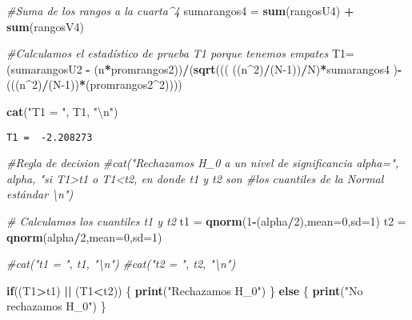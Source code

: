 \documentclass[
  a4paper,
  oneside,
  openany]{book}
\newenvironment{Shaded}{\begin{snugshade}}{\end{snugshade}}
\newcommand{\CharTok}[1]{\textcolor[rgb]{0.31,0.60,0.02}{#1}}
\newcommand{\CommentTok}[1]{\textcolor[rgb]{0.56,0.35,0.01}{\textit{#1}}}
\newcommand{\ControlFlowTok}[1]{\textcolor[rgb]{0.13,0.29,0.53}{\textbf{#1}}}
\newcommand{\DataTypeTok}[1]{\textcolor[rgb]{0.13,0.29,0.53}{#1}}
\newcommand{\DecValTok}[1]{\textcolor[rgb]{0.00,0.00,0.81}{#1}}
\newcommand{\KeywordTok}[1]{\textcolor[rgb]{0.13,0.29,0.53}{\textbf{#1}}}
\newcommand{\NormalTok}[1]{#1}
\newcommand{\OperatorTok}[1]{\textcolor[rgb]{0.81,0.36,0.00}{\textbf{#1}}}
\newcommand{\StringTok}[1]{\textcolor[rgb]{0.31,0.60,0.02}{#1}}
\begin{document}
\begin{Shaded}
\begin{Highlighting}[]
\CommentTok{\#Suma de los rangos a la cuarta\^{}4}
\NormalTok{sumarangos4 =}\StringTok{ }\KeywordTok{sum}\NormalTok{(rangosU4) }\OperatorTok{+}\StringTok{ }\KeywordTok{sum}\NormalTok{(rangosV4)}

\CommentTok{\#Calculamos el estadístico de prueba T1 porque tenemos empates}
\NormalTok{T1=(sumarangosU2 }\OperatorTok{{-}}\StringTok{ }\NormalTok{(n}\OperatorTok{*}\NormalTok{promrangos2))}\OperatorTok{/}\NormalTok{(}\KeywordTok{sqrt}\NormalTok{(((      ((n}\OperatorTok{\^{}}\DecValTok{2}\NormalTok{)}\OperatorTok{/}\NormalTok{(N}\DecValTok{{-}1}\NormalTok{))}\OperatorTok{/}\NormalTok{N)}\OperatorTok{*}\NormalTok{sumarangos4 )}\OperatorTok{{-}}\NormalTok{(((n}\OperatorTok{\^{}}\DecValTok{2}\NormalTok{)}\OperatorTok{/}\NormalTok{(N}\DecValTok{{-}1}\NormalTok{))}\OperatorTok{*}\NormalTok{(promrangos2}\OperatorTok{\^{}}\DecValTok{2}\NormalTok{))))}

\KeywordTok{cat}\NormalTok{(}\StringTok{"T1 = "}\NormalTok{, T1, }\StringTok{"}\CharTok{\textbackslash{}n}\StringTok{"}\NormalTok{)}
\end{Highlighting}
\end{Shaded}

\begin{verbatim}
T1 =  -2.208273 
\end{verbatim}

\begin{Shaded}
\begin{Highlighting}[]
\CommentTok{\#Regla de decision}
\CommentTok{\#cat("Rechazamos H\_0 a un nivel de significancia alpha=", alpha, "si T1\textgreater{}t1 o T1\textless{}t2, en donde t1 y t2 son \#los cuantiles de la Normal estándar \textbackslash{}n")}

\CommentTok{\# Calculamos los cuantiles t1 y t2 }
\NormalTok{t1 =}\StringTok{ }\KeywordTok{qnorm}\NormalTok{(}\DecValTok{1}\OperatorTok{{-}}\NormalTok{(alpha}\OperatorTok{/}\DecValTok{2}\NormalTok{),}\DataTypeTok{mean=}\DecValTok{0}\NormalTok{,}\DataTypeTok{sd=}\DecValTok{1}\NormalTok{)}
\NormalTok{t2 =}\StringTok{ }\KeywordTok{qnorm}\NormalTok{(alpha}\OperatorTok{/}\DecValTok{2}\NormalTok{,}\DataTypeTok{mean=}\DecValTok{0}\NormalTok{,}\DataTypeTok{sd=}\DecValTok{1}\NormalTok{)}

\CommentTok{\#cat("t1 = ", t1, "\textbackslash{}n")}
\CommentTok{\#cat("t2 = ", t2, "\textbackslash{}n")}

\ControlFlowTok{if}\NormalTok{((T1}\OperatorTok{\textgreater{}}\NormalTok{t1) }\OperatorTok{||}\StringTok{ }\NormalTok{(T1}\OperatorTok{\textless{}}\NormalTok{t2)) \{}
  \KeywordTok{print}\NormalTok{(}\StringTok{"Rechazamos H\_0"}\NormalTok{)}
\NormalTok{\} }\ControlFlowTok{else}\NormalTok{ \{}
  \KeywordTok{print}\NormalTok{(}\StringTok{"No rechazamos H\_0"}\NormalTok{)}
\NormalTok{\}}
\end{Highlighting}
\end{Shaded}
\end{document}
